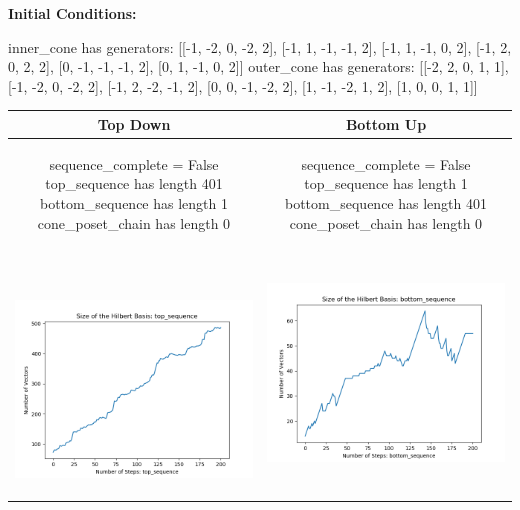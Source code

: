 \documentclass[10pt]{article}
\begin{document}
\textbf{Initial Conditions:}
\begin{SAGE}
inner_cone has generators: 
[[-1, -2, 0, -2, 2], [-1, 1, -1, -1, 2], [-1, 1, -1, 0, 2], [-1, 2, 0, 2, 2], [0, -1, -1, -1, 2], [0, 1, -1, 0, 2]]
outer_cone has generators: 
[[-2, 2, 0, 1, 1], [-1, -2, 0, -2, 2], [-1, 2, -2, -1, 2], [0, 0, -1, -2, 2], [1, -1, -2, 1, 2], [1, 0, 0, 1, 1]]

\end{SAGE}
\begin{tabular}{c|c}
\textbf{Top Down} & \textbf{Bottom Up} \\ \hline  
\begin{SAGE}
	sequence_complete = False
	top_sequence has length 401
	bottom_sequence has length 1
	cone_poset_chain has length 0
\end{SAGE} 
&
\begin{SAGE}
	sequence_complete = False
	top_sequence has length 1
	bottom_sequence has length 401
	cone_poset_chain has length 0
\end{SAGE} 
\\ \hline
\
\begin{minipage}{.45\textwidth}
\includegraphics[width=\textwidth]{"DATA/5d/6 generators 2 bound E/top_sequence SIZE"}
\end{minipage} &
\begin{minipage}{.45\textwidth}
\includegraphics[width=\textwidth]{"DATA/5d/6 generators 2 bound E bottomup/bottom_sequence SIZE"}

\end{minipage}
\end{tabular}
\end{document}
